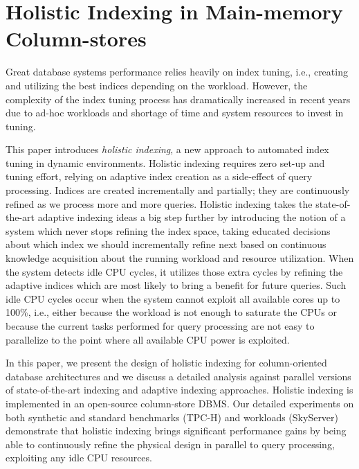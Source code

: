 \chapter{Holistic Indexing in Main-memory Column-stores}

\label{holistic}




	
Great database systems performance relies heavily on index tuning, i.e., creating and utilizing 
the best indices depending on the workload. 
However, the complexity of the index tuning process has dramatically increased in recent years
 due to ad-hoc workloads and shortage of time and system resources to invest in tuning.

This paper introduces \emph{holistic indexing}, a new approach 
to automated index tuning in dynamic environments.
Holistic indexing requires zero set-up and tuning effort, relying on adaptive index creation as 
a side-effect of query processing. Indices are created incrementally and partially;
they are continuously refined as we process more and more queries.
Holistic indexing takes the state-of-the-art adaptive indexing ideas a big step further
by introducing the notion of a system which never stops refining the index space, taking educated decisions
about which index we should incrementally refine next based on continuous knowledge acquisition 
about the running workload and resource utilization. 
When the system detects idle CPU cycles,  it utilizes those extra cycles by refining the adaptive indices
which are most likely to bring a benefit for future queries. 
Such idle CPU cycles occur when the system cannot exploit all available cores up to 100\%, 
i.e., either because the workload is not enough to saturate the CPUs
or because the current tasks performed for 
query processing are not easy to parallelize to the point where all available CPU power is exploited.  
 
In this paper, we present the design of  holistic indexing 
for column-oriented database architectures and we discuss a detailed analysis
against parallel versions of state-of-the-art indexing and adaptive indexing approaches.
Holistic indexing is implemented in an open-source column-store DBMS.
Our detailed experiments on both synthetic and standard benchmarks (TPC-H) and workloads (SkyServer) demonstrate that holistic indexing
brings significant performance gains by being able to continuously refine the physical design 
in parallel to query processing, exploiting any idle CPU resources. 




